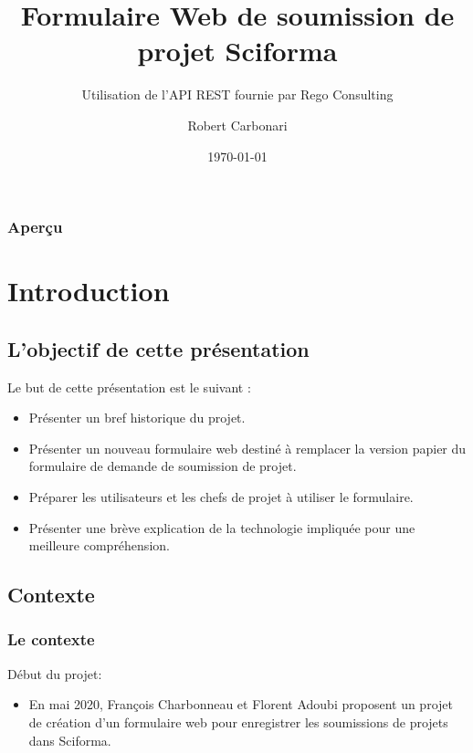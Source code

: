 \documentclass[aspectratio=169]{beamer}%
\title{Formulaire Web de soumission de projet Sciforma}
\subtitle{Utilisation de l'API REST fournie par Rego Consulting}
\author{Robert Carbonari}
\institute{
\inst{}Direction des ressources informationnelles et des technologies biomédicales\\
CHU Sainte-Justine}
\date{\today}
\let\note\relax
\begin{document}
\begin{frame}[plain]
\titlepage
\end{frame}

\begin{frame}[plain]

\frametitle{Aperçu}

\tableofcontents
\transwipe 
\end{frame}

\section{Introduction}
\subsection{L'objectif de cette présentation}
\begin{frame}
Le but de cette présentation est le suivant :
\begin{itemize}[<.->]
\item Présenter un bref historique du projet.
\item Présenter un nouveau formulaire web destiné à remplacer la version papier du formulaire de demande de soumission de projet.
\item Préparer les utilisateurs et les chefs de projet à utiliser le formulaire.
\item Présenter une brève explication de la technologie impliquée pour une meilleure compréhension.

\end{itemize}
\transwipe 
\end{frame}


\subsection{Contexte}
\begin{frame}
\frametitle{Le contexte}
Début du projet:
\begin{itemize}
	\item En mai 2020, François Charbonneau et Florent Adoubi proposent un projet de création d'un formulaire web pour enregistrer les soumissions de projets dans Sciforma.
\end{itemize}
\end{frame}
\end{document}
